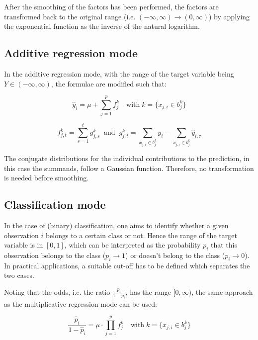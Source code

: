 \documentclass[BCOR=1mm, DIV=calc,10pt,
twoside=true,
twocolumn,
headings=normal]{scrartcl}
\begin{document}
After the smoothing of the factors has been performed, the factors are transformed back to
the original range (i.e. $(-\infty, \infty) \to (0, \infty)$) by applying the exponential
function as the inverse of the natural logarithm.


\subsection{Additive regression mode}

In the additive regression mode, with the range of the target variable being
$Y \in (-\infty, \infty)$, the formulae are modified such that:

\begin{equation}
\hat{y}_i = \mu + \sum \limits_{j=1}^p f^k_j  \quad \text{with}\; k=\{ x_{j,i} \in b^k_j\}
\end{equation}

\begin{equation}
f^k_{j,t} = \sum \limits_{s=1}^t g^k_{j,s} \;\; \mathrm{and} \;\; g^k_{j,t} = \sum \limits_{x_{j,i} \in b^k_j} y_i - \sum \limits_{x_{j,i} \in b^k_j} \hat{y}_{i,\tau}
\end{equation}

The conjugate distributions for the individual contributions to the prediction, in this
case the summands, follow a Gaussian function. Therefore, no transformation is needed
before smoothing.


\subsection{Classification mode}

In the case of (binary) classification, one aims to identify whether a given observation
$i$ belongs to a certain class or not. Hence the range of the target variable is in
$[0,1]$, which can be interpreted as the probability $p_i$ that this observation belongs
to the class ($p_i \to 1$) or doesn't belong to the class ($p_i \to 0$). In practical
applications, a suitable cut-off has to be defined which separates the two cases.

Noting that the odds, i.e. the ratio $\frac {p_i}{1-p_i}$, has the range $[0, \infty)$,
the same approach as the multiplicative regression mode can be used:

\begin{equation} \label{odds}
\frac{\hat{p}_i}{1 - \hat{p}_i} = \mu \cdot \prod \limits_{j=1}^p f^k_j  \quad \text{with}\; k=\{ x_{j,i} \in b^k_j\}
\end{equation}
\end{document}
